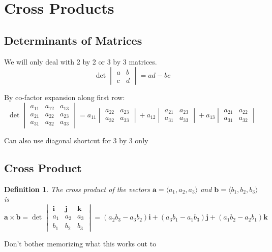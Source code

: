 \documentclass[letterpaper, 11pt, openany]{book}
\theoremstyle{mytheoremstyle}
\newtheorem{definition}{Definition}[section]
\theoremstyle{myexamplestyle}
\begin{document}
\section{Cross Products}
\setcounter{figure}{0}
\subsection{Determinants of Matrices}
We will only deal with 2 by 2 or 3 by 3 matrices.
\[\det
\begin{vmatrix}
    a & b\\
    c & d
\end{vmatrix} = ad - bc\]

By co-factor expansion along first row:
\[\det
\begin{vmatrix}
    a_{11} & a_{12} & a_{13}\\
    a_{21} & a_{22} & a_{23}\\
    a_{31} & a_{32} & a_{33}
\end{vmatrix} = a_{11} \begin{vmatrix} a_{22} & a_{23}\\a_{32} & a_{33}\end{vmatrix} + a_{12} \begin{vmatrix} a_{21} & a_{23}\\a_{31} & a_{33}\end{vmatrix} + a_{13} \begin{vmatrix} a_{21} & a_{22}\\a_{31} & a_{32}\end{vmatrix}\]

Can also use diagonal shortcut for 3 by 3 only

\subsection{Cross Product}
\begin{definition}\label{d:cross-product}
    The cross product of the vectors \(\mathbf{a} = \langle a_1, a_2, a_3\rangle\) and \(\mathbf{b} = \langle b_1, b_2, b_3\rangle\) is
    \[\mathbf{a} \times \mathbf{b} = \det \begin{vmatrix}
        \mathbf{i} &\mathbf{j} &\mathbf{k}\\
        a_1& a_2& a_3\\
        b_1& b_2& b_3
    \end{vmatrix} = (a_2 b_3-a_3 b_2) \mathbf{i} + (a_3 b_1-a_1 b_3) \mathbf{j} + (a_1 b_2-a_2 b_1)\mathbf{k}\]
\end{definition}
Don't bother memorizing what this works out to \faMeh
\end{document}
